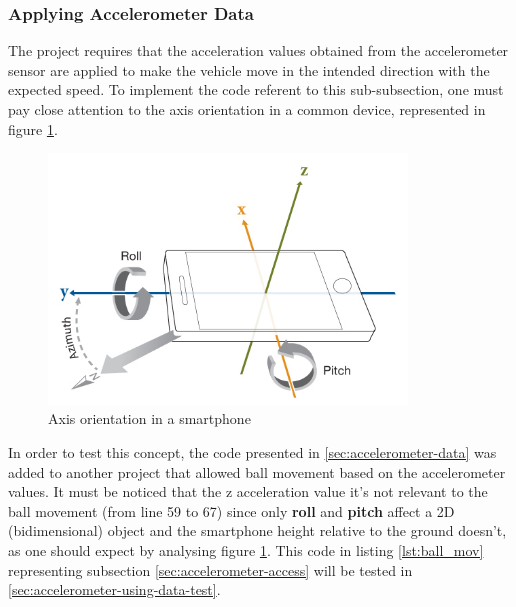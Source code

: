 \subsubsection{Applying Accelerometer Data}
\label{sec:using-accelerometer-data}
%
The project requires that the acceleration values obtained from the accelerometer sensor are applied to make the vehicle move in the intended direction with the expected speed. 
%
To implement the code referent to this sub-subsection, one must pay close attention to the axis orientation in a common device, represented in figure \ref{fig:axis-smartphone}.
%
\begin{figure}[!h]
\centering
\includegraphics[width=0.85\textwidth]{img/smartphone_axis.png}
\caption{\label{fig:axis-smartphone}Axis orientation in a smartphone}
\end{figure}
%
In order to test this concept, the code presented in \ref{sec:accelerometer-data} was added to another project that allowed ball movement based on the accelerometer values. It must be noticed that the z acceleration value it's not relevant to the ball movement (from line 59 to 67) since only \textbf{roll} and \textbf{pitch} affect a 2D (bidimensional) object and the smartphone height relative to the ground doesn't, as one should expect by analysing figure \ref{fig:axis-smartphone}.
%
This code in listing \ref{lst:ball_mov} representing subsection \ref{sec:accelerometer-access} will be tested in \ref{sec:accelerometer-using-data-test}.\\
%

%